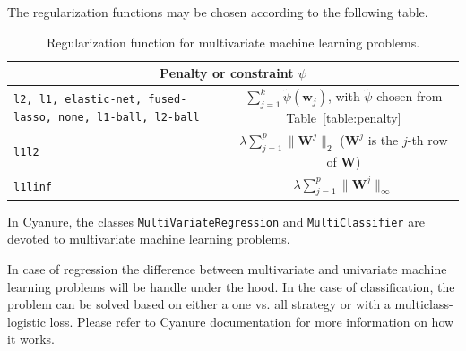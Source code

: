\documentclass{article}
\def\w{{\mathbf{w}}}
\def\W{{\mathbf{W}}}
\begin{document}
The regularization functions may be chosen according to the following table.
\begin{table}[h!]
   \centering
   \begin{tabular}{|p{5cm}|c|}
      \hline
      \multicolumn{2}{|c|}{Penalty or constraint $\psi$}     \\  
      \hline
      \texttt{l2, l1, elastic-net, fused-lasso, none, l1-ball, l2-ball} & 
      $\sum_{j=1}^k \tilde{\psi}(\w_j)$, with $\tilde{\psi}$ chosen from Table~\ref{table:penalty} \\
      \hline
      \texttt{l1l2} & $\lambda \sum_{j=1}^p \| \W^j\|_2$ ($\W^j$ is the $j$-th row of $\W$) \\ 
      \hline
      \texttt{l1linf} & $\lambda \sum_{j=1}^p \| \W^j\|_\infty$  \\ 
      \hline
   \end{tabular}
   \caption{Regularization function for multivariate machine learning problems.}
\end{table}

In Cyanure, the classes \texttt{MultiVariateRegression} and \texttt{MultiClassifier} are devoted to multivariate machine learning problems.

In case of regression the difference between multivariate and univariate machine learning problems will be handle under the hood.
In the case of classification, the problem can be solved based on either a one vs. all strategy or with a multiclass-logistic loss.
Please refer to Cyanure documentation for more information on how it works. 
\end{document}
